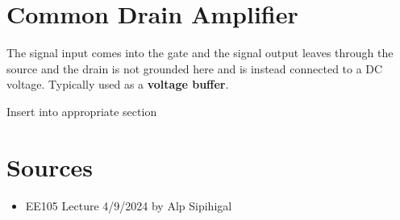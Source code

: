 \section{Common Drain Amplifier}
The signal input comes into the gate and the signal output leaves through the source and the drain is not grounded here and is instead connected to a DC voltage. Typically used as a \textbf{voltage buffer}.

\begin{todo}
    \item Insert into appropriate section
\end{todo}



\section{Sources}
\begin{itemize}
    \item EE105 Lecture 4/9/2024 by Alp Sipihigal
\end{itemize}